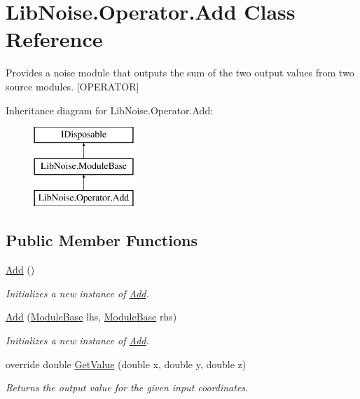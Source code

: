 \hypertarget{class_lib_noise_1_1_operator_1_1_add}{}\section{Lib\+Noise.\+Operator.\+Add Class Reference}
\label{class_lib_noise_1_1_operator_1_1_add}


Provides a noise module that outputs the sum of the two output values from two source modules. \mbox{[}O\+P\+E\+R\+A\+T\+OR\mbox{]}  


Inheritance diagram for Lib\+Noise.\+Operator.\+Add\+:\begin{figure}[H]
\begin{center}
\leavevmode
\includegraphics[height=3.000000cm]{class_lib_noise_1_1_operator_1_1_add}
\end{center}
\end{figure}
\subsection*{Public Member Functions}
\begin{DoxyCompactItemize}
\item 
\hyperlink{class_lib_noise_1_1_operator_1_1_add_a001b9daf3ba1d3788af02bbea835d0d5}{Add} ()
\begin{DoxyCompactList}\small\item\em Initializes a new instance of \hyperlink{class_lib_noise_1_1_operator_1_1_add}{Add}. \end{DoxyCompactList}\item 
\hyperlink{class_lib_noise_1_1_operator_1_1_add_a506cfb14045329aabff4a140e2160be6}{Add} (\hyperlink{class_lib_noise_1_1_module_base}{Module\+Base} lhs, \hyperlink{class_lib_noise_1_1_module_base}{Module\+Base} rhs)
\begin{DoxyCompactList}\small\item\em Initializes a new instance of \hyperlink{class_lib_noise_1_1_operator_1_1_add}{Add}. \end{DoxyCompactList}\item 
override double \hyperlink{class_lib_noise_1_1_operator_1_1_add_aa2050ab0e8177b28a092d11b7e4f9163}{Get\+Value} (double x, double y, double z)
\begin{DoxyCompactList}\small\item\em Returns the output value for the given input coordinates. \end{DoxyCompactList}\end{DoxyCompactItemize}
